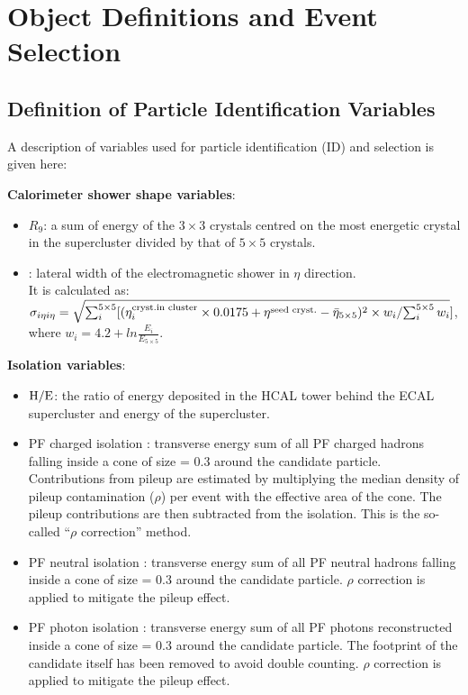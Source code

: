 \documentclass[thesis.tex]{subfiles}
\renewcommand\_{\textunderscore\allowbreak}
\begin{document}
\chapter{Object Definitions and Event Selection}
\label{ch5}

\section{Definition of Particle Identification Variables}
A description of variables used for particle identification (ID) and selection is given here:

\noindent \textbf{Calorimeter shower shape variables}:
\begin{itemize}
	\item $R_9$: a sum of energy of the $3\times3$ crystals centred on the most energetic crystal in the supercluster divided by that of $5\times5$ crystals. 
	\item \Sigmaieie: lateral width of the electromagnetic shower in $\eta$ direction. \\
		It is calculated as: $\sigma_{i\eta i\eta} = \sqrt{\sum_i^{5\times5}[(\eta_i^{\text{cryst.in cluster}}\times 0.0175 + \eta^{\text{seed cryst.}} - \bar{\eta}_{5\times5})^2 \times w_i/{\sum_i^{5\times5}w_i}}]$, where $w_i = 4.2+ln\frac{E_i}{E_{5\times5}}$.
\end{itemize}
\noindent \textbf{Isolation variables}:
\begin{itemize}
	\item $\mathrm{H/E}$: the ratio of energy deposited in the HCAL tower behind the ECAL supercluster and energy of the supercluster.
	\item PF charged isolation \ChIso: transverse energy sum of all PF charged hadrons falling inside a cone of size \DeltaR = 0.3 around the candidate particle. Contributions from pileup are estimated by multiplying the median density of pileup contamination ($\rho$) per event with the effective area of the cone. The pileup contributions are then subtracted from the isolation. This is the so-called ``$\rho$ correction'' method. 
	\item PF neutral isolation \NeuIso:  transverse energy sum of all PF neutral hadrons falling inside a cone of size \DeltaR = 0.3 around the candidate particle. $\rho$ correction is applied to mitigate the pileup effect. 
	\item PF photon isolation \PhoIso: transverse energy sum of all PF photons reconstructed inside a cone of size \DeltaR = 0.3 around the candidate particle. The footprint of the candidate itself has been removed to avoid double counting. $\rho$ correction is applied to mitigate the pileup effect.
\end{itemize}
\end{document}
